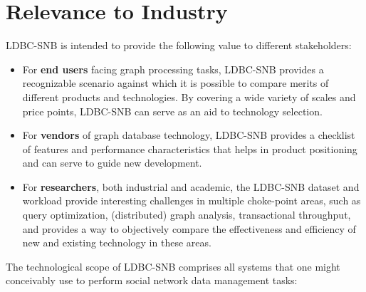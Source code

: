 
\section{Relevance to Industry}

LDBC-SNB is intended to provide the following value to different stakeholders:

\begin{itemize}
 \item For \textbf{end users} facing graph processing tasks, LDBC-SNB provides
     a recognizable scenario against which it is possible to compare merits of
     different products and technologies.  By covering a wide variety of scales
     and price points, LDBC-SNB can serve as an aid to technology selection.
 \item For \textbf{vendors} of graph database technology, LDBC-SNB provides a
     checklist of features and performance characteristics that helps in
     product positioning and can serve to guide new development.
 \item For \textbf{researchers}, both industrial and academic, the LDBC-SNB
     dataset and workload provide interesting challenges in multiple
     choke-point areas, such as query optimization, (distributed) graph
     analysis, transactional throughput, and provides a way to objectively
     compare the effectiveness and efficiency of new and existing technology in
     these areas.
\end{itemize}

The technological scope of LDBC-SNB comprises all systems that one might
conceivably use to perform social network data management tasks:

